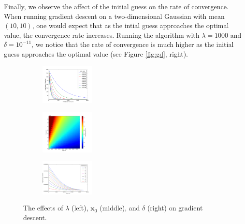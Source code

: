 \documentclass[10pt]{paper}
\begin{document}
Finally, we observe the affect of the initial guess on the rate of convergence. When running gradient descent on a two-dimensional Gaussian with mean $(10, 10)$, one would expect that as the intial guess approaches the optimal value, the convergence rate increases. Running the algorithm with $\lambda = 1000$ and $\delta = 10^{-11}$, we notice that the rate of convergence is much higher as the initial guess approaches the optimal value (see Figure \ref{fig:gd}, right).

\begin{figure}[ht!]
  \label{fig:gd}
  \centering
  \begin{subfigure}
    \centering
      \includegraphics[width=0.3\textwidth]{../images/quadratic_steps_vs_mag}
  \end{subfigure}
  \begin{subfigure}
    \centering
      \includegraphics[width=0.3\textwidth]{../images/lsq_error_gradient}
  \end{subfigure}
   \begin{subfigure}
    \centering
      \includegraphics[width=0.3\textwidth]{../images/guess_vs_mags_2}
  \end{subfigure}
  \caption{The effects of $\lambda$ (left), $\mathbf{x}_0$ (middle), and $\delta$ (right) on gradient descent.}
\end{figure}
\end{document}
